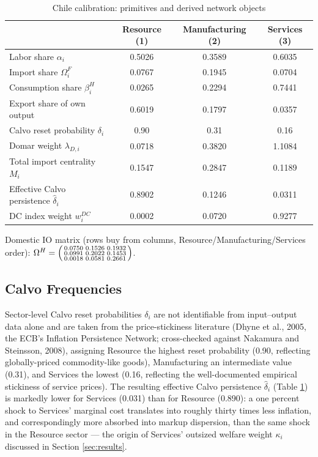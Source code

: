 \documentclass[12pt]{article}
\begin{document}
\begin{table}[H]
\centering
\caption{Chile calibration: primitives and derived network objects}
\label{tab:chile_calib}
\begin{tabular}{lccc}
\toprule
 & Resource (1) & Manufacturing (2) & Services (3) \\
\midrule
Labor share $\alpha_i$ & 0.5026 & 0.3589 & 0.6035 \\
Import share $\Omega^F_i$ & 0.0767 & 0.1945 & 0.0704 \\
Consumption share $\beta^H_i$ & 0.0265 & 0.2294 & 0.7441 \\
Export share of own output & 0.6019 & 0.1797 & 0.0357 \\
Calvo reset probability $\delta_i$ & 0.90 & 0.31 & 0.16 \\
\midrule
Domar weight $\lambda_{D,i}$ & 0.0718 & 0.3820 & 1.1084 \\
Total import centrality $M_i$ & 0.1547 & 0.2847 & 0.1189 \\
Effective Calvo persistence $\hat\delta_i$ & 0.8902 & 0.1246 & 0.0311 \\
DC index weight $w_i^{DC}$ & 0.0002 & 0.0720 & 0.9277 \\
\bottomrule
\end{tabular}
\end{table}

\noindent Domestic IO matrix (rows buy from columns, Resource/Manufacturing/Services order):
$\Omega^H = \begin{psmallmatrix}0.0750 & 0.1526 & 0.1932\\ 0.0991 & 0.2022 & 0.1453 \\ 0.0018 & 0.0581 &
0.2661\end{psmallmatrix}$.

\subsection{Calvo Frequencies}

Sector-level Calvo reset probabilities $\delta_i$ are not identifiable from input--output data alone
and are taken from the price-stickiness literature (Dhyne et al., 2005, the ECB's Inflation
Persistence Network; cross-checked against Nakamura and Steinsson, 2008), assigning Resource the
highest reset probability (0.90, reflecting globally-priced commodity-like goods), Manufacturing an
intermediate value (0.31), and Services the lowest (0.16, reflecting the well-documented empirical
stickiness of service prices). The resulting effective Calvo persistence $\hat\delta_i$ (Table
\ref{tab:chile_calib}) is markedly lower for Services (0.031) than for Resource (0.890): a one
percent shock to Services' marginal cost translates into roughly thirty times less inflation, and
correspondingly more absorbed into markup dispersion, than the same shock in the Resource sector ---
the origin of Services' outsized welfare weight $\kappa_i$ discussed in Section \ref{sec:results}.
\end{document}

